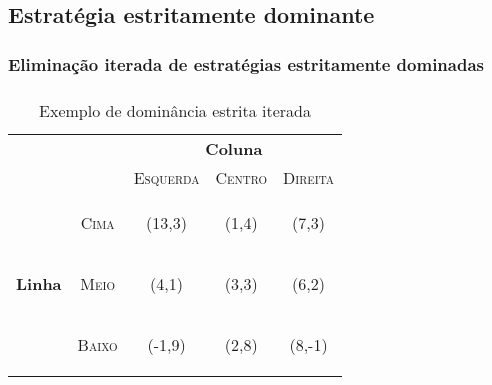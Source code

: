 \subsection*{Estratégia estritamente dominante}

\begin{frame}
\frametitle{\subsecname}

\end{frame}



\subsubsection*{Eliminação iterada de estratégias estritamente dominadas}
\begin{frame}
\frametitle{\subsubsecname}
\begin{table}[ht]
\centering
\begin{tabular}{|c|c|c|c|c|}
\cline{3-5}
\multicolumn{1}{c}{} &  & \multicolumn{3}{c|}{\textbf{Coluna}}\tabularnewline
\cline{3-5}
\multicolumn{1}{c}{} &  & \textsc{Esquerda} & \textsc{Centro} & \textsc{Direita}\tabularnewline
\hline
\multirow{3}{*}{\begin{turn}{90}
\textbf{Linha}
\end{turn}} & \begin{turn}{90}
\textsc{Cima}
\end{turn} & {\Large(13,3)} & {\Large(1,4)} & {\Large(7,3)} \tabularnewline
\cline{2-5}
 & \begin{turn}{90}
\textsc{Meio}
\end{turn} & {\Large(4,1)} & {\Large(3,3)} & {\Large(6,2)} \tabularnewline
\cline{2-5}
 & \begin{turn}{90}
\textsc{Baixo}
\end{turn} &  {\Large(-1,9)} & {\Large(2,8)} & {\Large(8,-1)} \tabularnewline
\hline
\end{tabular}
\caption{Exemplo de dominância estrita iterada}
\label{tab:dominancia-estrita-iterada}
\end{table}
\end{frame}

